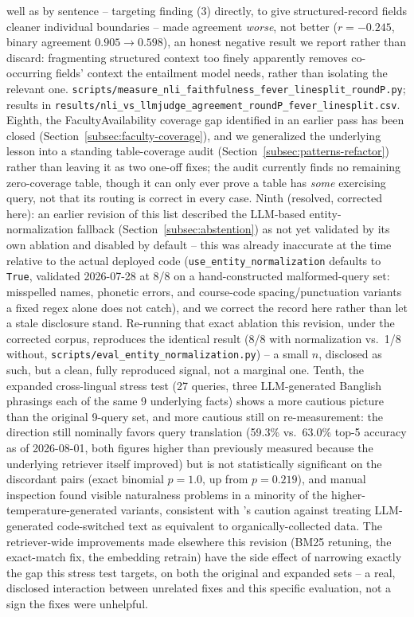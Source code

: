 \documentclass[a4paper,twoside]{article}
\begin{document}
well as by sentence -- targeting finding (3) directly, to give structured-record fields cleaner individual boundaries -- made agreement \emph{worse}, not better ($r=-0.245$, binary agreement $0.905\to0.598$), an honest negative result we report rather than discard: fragmenting structured context too finely apparently removes co-occurring fields' context the entailment model needs, rather than isolating the relevant one. \texttt{scripts/measure\_nli\_faithfulness\_fever\_linesplit\_roundP.py}; results in \texttt{results/nli\_vs\_llmjudge\_agreement\_roundP\_fever\_linesplit.csv}. Eighth, the FacultyAvailability coverage gap identified in an earlier pass has been closed (Section~\ref{subsec:faculty-coverage}), and we generalized the underlying lesson into a standing table-coverage audit (Section~\ref{subsec:patterns-refactor}) rather than leaving it as two one-off fixes; the audit currently finds no remaining zero-coverage table, though it can only ever prove a table has \emph{some} exercising query, not that its routing is correct in every case. Ninth (resolved, corrected here): an earlier revision of this list described the LLM-based entity-normalization fallback (Section~\ref{subsec:abstention}) as not yet validated by its own ablation and disabled by default -- this was already inaccurate at the time relative to the actual deployed code (\texttt{use\_entity\_normalization} defaults to \texttt{True}, validated 2026-07-28 at 8/8 on a hand-constructed malformed-query set: misspelled names, phonetic errors, and course-code spacing/punctuation variants a fixed regex alone does not catch), and we correct the record here rather than let a stale disclosure stand. Re-running that exact ablation this revision, under the corrected corpus, reproduces the identical result (8/8 with normalization vs.\ 1/8 without, \texttt{scripts/eval\_entity\_normalization.py}) -- a small $n$, disclosed as such, but a clean, fully reproduced signal, not a marginal one. Tenth, the expanded cross-lingual stress test (27 queries, three LLM-generated Banglish phrasings each of the same 9 underlying facts) shows a more cautious picture than the original 9-query set, and more cautious still on re-measurement: the direction still nominally favors query translation (59.3\% vs.\ 63.0\% top-5 accuracy as of 2026-08-01, both figures higher than previously measured because the underlying retriever itself improved) but is not statistically significant on the discordant pairs (exact binomial $p=1.0$, up from $p=0.219$), and manual inspection found visible naturalness problems in a minority of the higher-temperature-generated variants, consistent with \citet{dogruoz2023representativeness}'s caution against treating LLM-generated code-switched text as equivalent to organically-collected data. The retriever-wide improvements made elsewhere this revision (BM25 retuning, the exact-match fix, the embedding retrain) have the side effect of narrowing exactly the gap this stress test targets, on both the original and expanded sets -- a real, disclosed interaction between unrelated fixes and this specific evaluation, not a sign the fixes were unhelpful.
\end{document}
